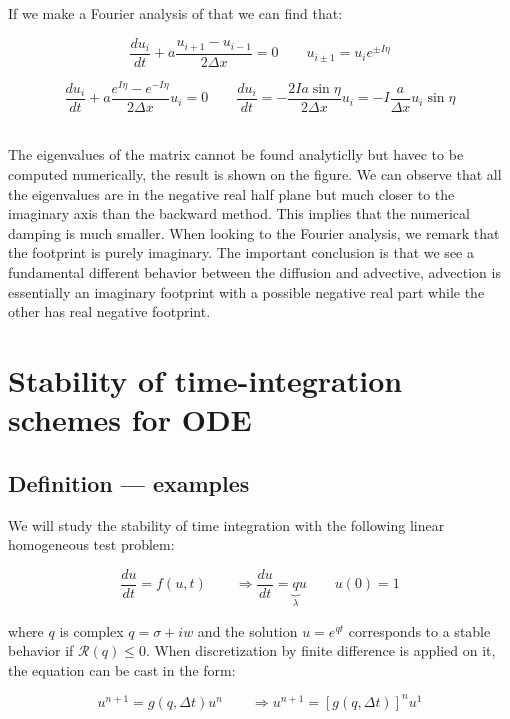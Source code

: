 If we make a Fourier analysis of that we can find that: 

\begin{equation}
\frac{du_i}{dt} + a \frac{u_{i+1}-u_{i-1}}{2\Delta x} = 0 \qquad u_{i\pm 1} = u_ie^{\pm I\eta }
\end{equation}

\begin{equation}
\frac{du_i}{dt}+ a \frac{e^{I\eta}-e^{-I\eta}}{2\Delta x} u _i = 0\qquad \frac{du_i}{dt} = -\frac{2Ia\sin \eta}{2\Delta x}u_i = - I\frac{a}{\Delta x}u_i \sin \eta
\end{equation}

\ \\
The eigenvalues of the matrix cannot be found analyticlly but havec to be computed numerically, the result is shown on the figure. We can observe that all the eigenvalues are in the negative real half plane but much closer to the imaginary axis than the backward method. This implies that the numerical damping is much smaller. When looking to the Fourier analysis, we remark that the footprint is purely imaginary. The important conclusion is that we see a fundamental different behavior between the diffusion and advective, advection is essentially an imaginary footprint with a possible negative real part while the other has real negative footprint. 

\section{Stability of time-integration schemes for ODE}
\subsection{Definition — examples}
We will study the stability of time integration with the following linear  homogeneous test problem:

\begin{equation}
\frac{du}{dt} = f(u,t) \qquad \Rightarrow \frac{du}{dt} = \underbrace{q}_{\lambda}u\qquad u(0) = 1
\end{equation}

where $q$ is complex $q = \sigma + i w$ and the solution $u = e^{qt}$ corresponds to a stable behavior if $\mathcal{R}(q)\leq 0$. When discretization by finite difference is applied on it, the equation can be cast in the form:  

\begin{equation}
u^{n+1} = g(q, \Delta t) u ^n \qquad \Rightarrow u^{n+1} = [g(q, \Delta t)]^n u ^1
\end{equation} 

